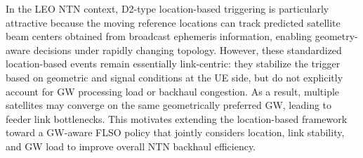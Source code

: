 In the LEO NTN context, D2-type location-based triggering is particularly attractive because the moving reference locations can track predicted satellite beam centers obtained from broadcast ephemeris information, enabling geometry-aware decisions under rapidly changing topology. However, these standardized location-based events remain essentially link-centric: they stabilize the trigger based on geometric and signal conditions at the UE side, but do not explicitly account for GW processing load or backhaul congestion. As a result, multiple satellites may converge on the same geometrically preferred GW, leading to feeder link bottlenecks. This motivates extending the location-based framework toward a GW-aware FLSO policy that jointly considers location, link stability, and GW load to improve overall NTN backhaul efficiency.





